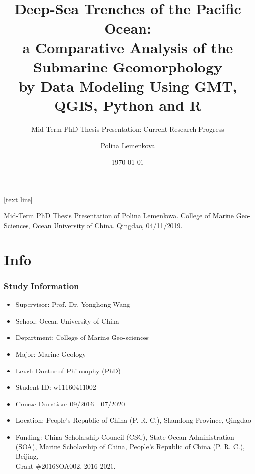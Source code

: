 \documentclass[pdflatex,compress,8pt,
	xcolor={dvipsnames,dvipsnames,svgnames,x11names,table},
	hyperref={colorlinks = true,breaklinks = true, urlcolor = NavyBlue, breaklinks = true}]{beamer}
\title{Deep-Sea Trenches of the Pacific Ocean:\\
a Comparative Analysis of the Submarine Geomorphology \\
by Data Modeling Using GMT, QGIS, Python and R}
\subtitle{Mid-Term PhD Thesis Presentation: Current Research Progress}
\author{Polina Lemenkova}
\institute{Ocean University of China, College of Marine Geo-Sciences}
\date{\today}
\begin{document}
\maketitle
[text line]{%
\parbox{\linewidth}{\vspace*{-8pt}Mid-Term PhD Thesis Presentation of Polina Lemenkova. College of Marine Geo-Sciences, Ocean University of China. Qingdao, 04/11/2019.} \hfill\insertpagenumber}


\section{Info}
 \begin{frame}\frametitle{Study Information}
\begin{itemize}
        	\item Supervisor: Prof. Dr. Yonghong Wang
	\item School: Ocean University of China
	\item Department: College of Marine Geo-sciences
	\item Major: Marine Geology
	\item Level: Doctor of Philosophy (PhD)
	\item Student ID: w11160411002
	\item Course Duration: 09/2016 - 07/2020
	\item Location: People's Republic of China (P. R. C.), Shandong Province, Qingdao
	\item Funding: China Scholarship Council (CSC), State Ocean Administration (SOA), Marine Scholarship of China, 
	People's Republic of China (P. R. C.), Beijing, \\
	Grant \#2016SOA002, 2016-2020.		
\end{itemize}
\end{frame}
\end{document}
